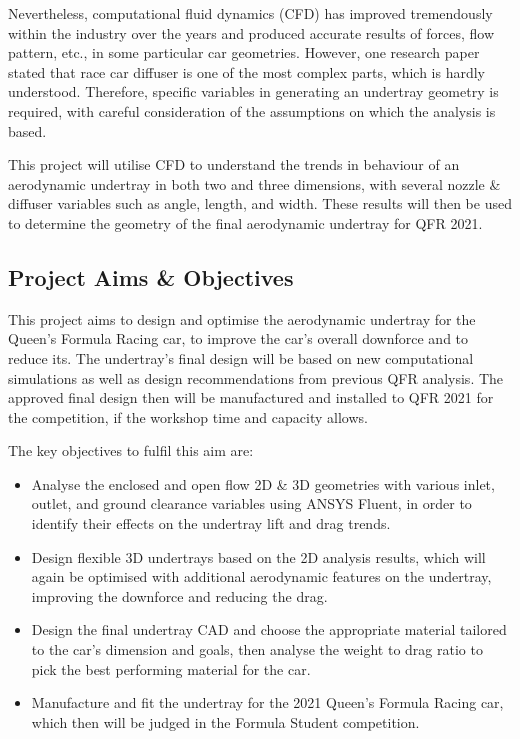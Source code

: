 \noindent Nevertheless, computational fluid dynamics (CFD) has improved tremendously within the industry over the years and produced accurate results of forces, flow pattern, etc., in some particular car geometries. However, one research paper \cite{Zhang2006GroundCars} stated that race car diffuser is one of the most complex parts, which is hardly understood. Therefore, specific variables in generating an undertray geometry is required, with careful consideration of the assumptions on which the analysis is based.

\noindent This project will utilise CFD to understand the trends in behaviour of an aerodynamic undertray in both two and three dimensions, with several nozzle \& diffuser variables such as angle, length, and width. These results will then be used to determine the geometry of the final aerodynamic undertray for QFR 2021.

\subsection{Project Aims \& Objectives}
This project aims to design and optimise the aerodynamic undertray for the Queen's Formula Racing car, to improve the car's overall downforce and to reduce its. The undertray's final design will be based on new computational simulations as well as design recommendations from previous QFR analysis. The approved final design then will be manufactured and installed to QFR 2021 for the competition, if the workshop time and capacity allows.

\noindent
The key objectives to fulfil this aim are:
\begin{itemize}

    \item Analyse the enclosed and open flow 2D \& 3D geometries with various inlet, outlet, and ground clearance variables using ANSYS Fluent, in order to identify their effects on the undertray lift and drag trends. 
    
    \item Design flexible 3D undertrays based on the 2D analysis results, which will again be optimised with additional aerodynamic features on the undertray, improving the downforce and reducing the drag.
    
	\item Design the final undertray CAD and choose the appropriate material tailored to the car’s dimension and goals, then analyse the weight to drag ratio to pick the best performing material for the car.
	
    \item Manufacture and fit the undertray for the 2021 Queen’s Formula Racing car, which then will be judged in the Formula Student competition.
\end{itemize}